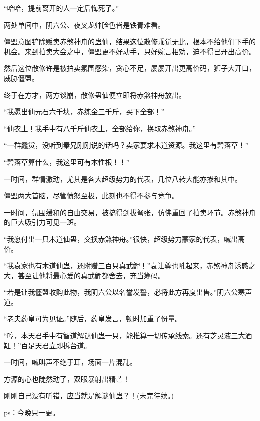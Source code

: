 \begin{this_body}
“哈哈，提前离开的人一定后悔死了。”

两处单间中，阴六公、夜叉龙帅脸色皆是铁青难看。

僵盟意图铲除贩卖赤煞神舟的蛊仙，结果这位散修乖觉无比，根本不给他们下手的机会。来到拍卖大会之中，僵盟更不好动手，只好婉言相劝，迫不得已开出高价。

然后这位散修许是被拍卖氛围感染，贪心不足，屡屡开出更高价码，狮子大开口，威胁僵盟。

终于在方才，两方谈崩，散修蛊仙便立即将赤煞神舟放出。

“我愿出仙元石六千块，赤练金三千斤，买下全部！”

“仙农土！我手中有八千斤仙农土，全部给你，换取赤煞神舟。”

“一群蠢货，没听到秦兄刚刚说的话吗？卖家要求木道资源。我这里有碧落草！”

“碧落草算什么，我这里可有本性根！！”

一时间，群情激动，尤其是各大超级势力的代表，几位八转大能亦掺和其中。

僵盟两大首脑，尽管愤怒至极，此刻也不得不参与竞争。

一时间，氛围缓和的自由交易，被搞得剑拔弩张，仿佛重回了拍卖环节。赤煞神舟的巨大吸引力可见一斑。

“我愿付出一只木道仙蛊，交换赤煞神舟。”很快，超级势力蒙家的代表，喊出高价。

“我袁家也有木道仙蛊，还附赠三百只真武鲤！”袁让尊也吼起来，赤煞神舟诱惑之大，甚至让他将最心爱的真武鲤都舍去，充当筹码。

“若是让我僵盟收购此物，我阴六公以名誉发誓，必将此方再度出售。”阴六公寒声道。

“老夫药皇可为见证。”随后，药皇发言，顿时加重了份量。

“哼，本天君手中有智道解谜仙蛊一只，能推算一切传承线索。还有芝灵液三大酒缸！”百足天君立即拆台道。

一时间，喊叫声不绝于耳，场面一片混乱。

方源的心也陡然动了，双眼暴射出精芒！

刚刚自己没有听错，应当就是解谜仙蛊？！(未完待续。)

ps：今晚只一更。

\end{this_body}

